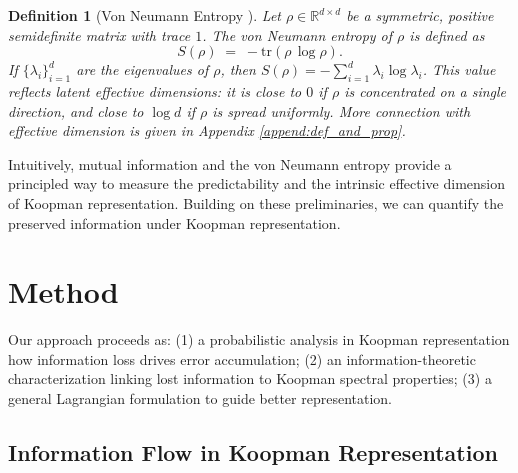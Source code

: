 \documentclass{article} %
\newtheorem{definition}[theorem]{Definition}
\begin{document}
\begin{definition}[Von Neumann Entropy \citep{witten2020mini}] \label{Effective Dimension}
Let \( \rho \in \mathbb{R}^{d \times d} \) be a symmetric, positive semidefinite matrix with trace \(1\).  
The \emph{von Neumann entropy} of \( \rho \) is defined as
\[
S(\rho) \;=\; - \mathrm{tr}\!\left(\rho \, \log \rho \right).
\]
If \(\{\lambda_i\}_{i=1}^d\) are the eigenvalues of \(\rho\), then $S(\rho) = - \sum_{i=1}^d \lambda_i \log \lambda_i$. This value reflects latent effective dimensions: it is close to \(0\) if \( \rho \) is concentrated on a single direction, and close to \(\log d\) if \( \rho \) is spread uniformly. More connection with effective dimension is given in Appendix \ref{append:def_and_prop}. 
\end{definition}

Intuitively, mutual information and the von Neumann entropy provide a principled way to measure the predictability and the intrinsic effective dimension of Koopman representation. Building on these preliminaries, we can quantify the preserved information under Koopman representation.

\section{Method}\label{sec:method}

Our approach proceeds as:  
(1) a probabilistic analysis in Koopman representation how information loss drives error accumulation;
(2) an information-theoretic characterization linking lost information to Koopman spectral properties;  
(3) a general Lagrangian formulation to guide better representation. 

\subsection{Information Flow in Koopman Representation}
\end{document}
